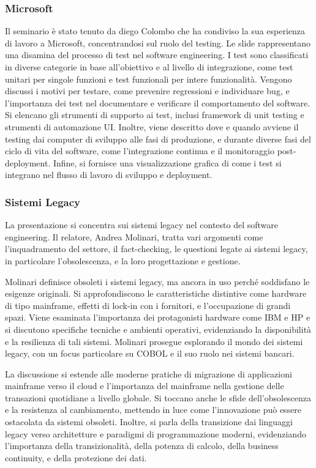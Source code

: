 \documentclass[11pt, a4paper]{article}
\theoremstyle{definition}
\begin{document}
\subsubsection{Microsoft}
Il seminario è stato tenuto da diego Colombo che ha condiviso la sua
esperienza di lavoro a Microsoft, concentrandosi sul ruolo del testing.
Le slide rappresentano una disamina del processo di test nel software
engineering. I test sono classificati in diverse categorie in base all'obiettivo
e al livello di integrazione, come test unitari per singole funzioni e test
funzionali per intere funzionalità. Vengono discussi i motivi per testare,
come prevenire regressioni e individuare bug, e l'importanza dei test nel
documentare e verificare il comportamento del software. Si elencano gli
strumenti di supporto ai test, inclusi framework di unit testing e strumenti
di automazione UI. Inoltre, viene descritto dove e quando avviene il testing
dai computer di sviluppo alle fasi di produzione, e durante diverse fasi
del ciclo di vita del software, come l'integrazione continua e il
monitoraggio post-deployment. Infine, si fornisce una visualizzazione
grafica di come i test si integrano nel flusso di lavoro di sviluppo e
deployment.

\subsubsection{Sistemi Legacy}
La presentazione si concentra sui sistemi legacy nel contesto del software engineering.
Il relatore, Andrea Molinari, tratta vari argomenti come l'inquadramento del settore,
il fact-checking, le questioni legate ai sistemi legacy, in particolare l'obsolescenza,
e la loro progettazione e gestione.

Molinari definisce obsoleti i sistemi legacy, ma ancora in uso perché soddisfano le
esigenze originali. Si
approfondiscono le caratteristiche distintive come hardware di tipo mainframe, effetti
di lock-in con i fornitori, e l'occupazione di grandi spazi. Viene esaminata l'importanza
dei protagonisti hardware come IBM e HP e si discutono specifiche tecniche e ambienti
operativi, evidenziando la disponibilità e la resilienza di tali sistemi.
Molinari
prosegue esplorando il mondo dei sistemi legacy, con un focus
particolare su COBOL e il suo ruolo nei sistemi bancari.

La discussione si estende alle moderne pratiche di migrazione di applicazioni mainframe
verso il cloud e l'importanza del mainframe nella gestione delle transazioni quotidiane
a livello globale. Si toccano anche le sfide dell'obsolescenza e la resistenza al cambiamento,
mettendo in luce come l'innovazione può essere ostacolata da
sistemi obsoleti. Inoltre, si parla della transizione dai linguaggi legacy verso architetture
e paradigmi di programmazione moderni, evidenziando l'importanza della transizionalità,
della potenza di calcolo, della business continuity, e della protezione dei dati.
\end{document}
